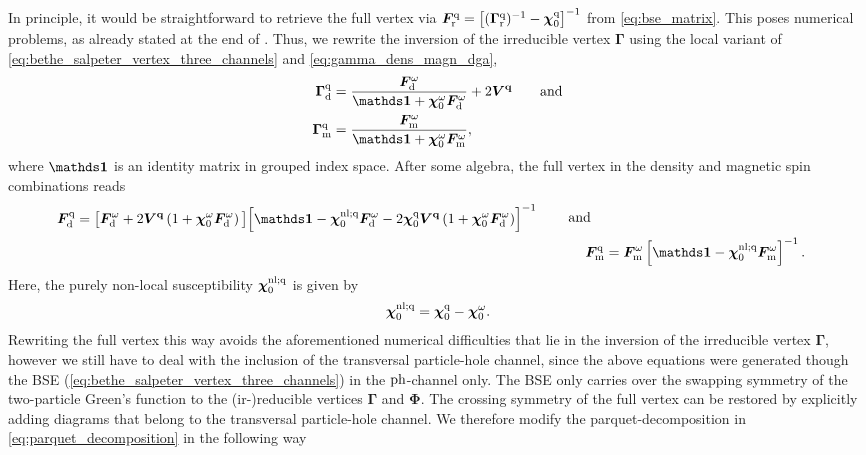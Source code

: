 \documentclass[../../main.tex]{subfiles}
\begin{document}
In principle, it would be straightforward to retrieve the full vertex via $\bm F_{\text{r}}^{\text{q}}=\left [(\bm\Gamma_{\text{r}}^{\text{q}})^{-1}-\bm\chi_{0}^{\text{q}}\right ]^{-1}$ from \eqref{eq:bse_matrix}. This poses numerical problems, as already stated at the end of . Thus, we rewrite the inversion of the irreducible vertex $\bm\Gamma$ using the local variant of \eqref{eq:bethe_salpeter_vertex_three_channels} and \eqref{eq:gamma_dens_magn_dga},
\begin{subequations}
\begin{align}
	\bm\Gamma_{\dens}^{\q}&=\frac{\bm F_{\dens}^{\omega}}{\bm\unity+\bm\chi_{0}^{\omega}\bm F_{\dens}^{\omega}}+2\bm V^{\vv{q}}\qqand\\
	\bm\Gamma_{\magn}^{\q}&=\frac{\bm F_{\magn}^{\omega}}{\bm\unity+\bm\chi_{0}^{\omega}\bm F_{\magn}^{\omega}},
\end{align}
\end{subequations}
where $\bm\unity$ is an identity matrix in grouped index space. After some algebra, the full vertex in the density and magnetic spin combinations reads
\begin{subequations}
\begin{align}
\begin{split}
	\bm F_{\dens}^{\q}&=\big [\bm F_{\dens}^{\omega}+2\bm V^{\vv{q}}\left (1+\bm\chi_{0}^{\omega}\bm F_{\dens}^{\omega}\right )\big ]\!\left [\bm\unity-\bm\chi_{0}^{\nl;\q}\bm F_{\dens}^{\omega}-2\bm\chi_{0}^{\q}\bm V^{\vv{q}}\left (1+\bm\chi_{0}^{\omega}\bm F_{\dens}^{\omega}\right )\right ]^{-1}
\end{split}\;\quad\text{and}\quad\\
	\bm F_{\magn}^{\q}&=\bm F_{\magn}^{\omega}\left [\bm\unity-\bm\chi_{0}^{\nl;\q}\bm F_{\magn}^{\omega}\right ]^{-1}.
\end{align}
\end{subequations}
Here, the purely non-local susceptibility $\bm\chi_{0}^{\text{nl};\text{q}}$ is given by
\begin{align}
	\bm\chi_{0}^{\text{nl};\text{q}}=\bm\chi_{0}^{\text{q}}-\bm\chi_{0}^{\omega}.
\end{align}
Rewriting the full vertex this way avoids the aforementioned numerical difficulties that lie in the inversion of the irreducible vertex $\bm\Gamma$, however we still have to deal with the inclusion of the transversal particle-hole channel, since the above equations were generated though the BSE (\ref{eq:bethe_salpeter_vertex_three_channels}) in the $\text{ph}$-channel only. The BSE only carries over the swapping symmetry of the two-particle Green's function to the (ir-)reducible vertices $\bm\Gamma$ and $\bm\Phi$. The crossing symmetry of the full vertex can be restored by explicitly adding diagrams that belong to the transversal particle-hole channel. We therefore modify the parquet-decomposition in \eqref{eq:parquet_decomposition} in the following way
\end{document}

